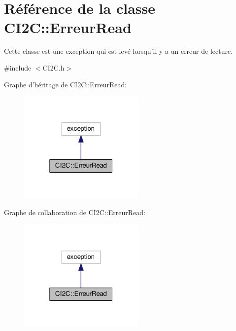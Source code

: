\hypertarget{class_c_i2_c_1_1_erreur_read}{\section{Référence de la classe C\+I2\+C\+:\+:Erreur\+Read}
\label{class_c_i2_c_1_1_erreur_read}
}


Cette classe est une exception qui est levé lorsqu'il y a un erreur de lecture.  




{\ttfamily \#include $<$C\+I2\+C.\+h$>$}



Graphe d'héritage de C\+I2\+C\+:\+:Erreur\+Read\+:
\nopagebreak
\begin{figure}[H]
\begin{center}
\leavevmode
\includegraphics[width=175pt]{class_c_i2_c_1_1_erreur_read__inherit__graph}
\end{center}
\end{figure}


Graphe de collaboration de C\+I2\+C\+:\+:Erreur\+Read\+:
\nopagebreak
\begin{figure}[H]
\begin{center}
\leavevmode
\includegraphics[width=175pt]{class_c_i2_c_1_1_erreur_read__coll__graph}
\end{center}
\end{figure}
